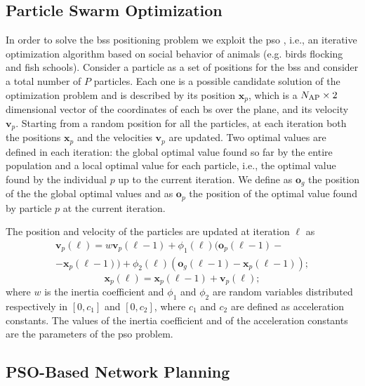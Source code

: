 \documentclass[twocolumns]{IEEEtran}
\begin{document}
\subsection{Particle Swarm Optimization}
In order to solve the \acp{bs} positioning problem we exploit the \ac{pso} \cite{Kennedy-11}, i.e., an iterative optimization algorithm based on social behavior of animals (e.g. birds flocking and fish schools). Consider a particle as a set of positions for the \acp{bs} and consider a total number of $P$ particles. Each one is a possible candidate solution of the optimization problem and is described by its position $\bm{x}_p$, which is a $N_{\rm AP} \times 2$ dimensional vector of the coordinates of each \ac{bs} over the plane, and its velocity $\bm{v}_p$.
Starting from a random position for all the particles, at each iteration both the positions $\bm{x}_p$ and the velocities $\bm{v}_p$ are updated. Two optimal values are defined in each iteration: the global optimal value found so far by the entire population and a local optimal value for each particle, i.e., the optimal value found by the individual $p$ up to the current iteration. We define as $\bm{o}_g$ the position of the the global optimal values and as $\bm{o}_p$ the position of the optimal value found by particle $p$ at the current iteration.

The position and velocity of the particles are updated at iteration $\ell$ as
   \begin{equation}\label{eq: v up}
\begin{split}
  \bm{v}_p(\ell) = w\bm{v}_p(\ell-1)+\phi_1(\ell)(\bm{o}_p(\ell-1)-\\
  -\bm{x}_p(\ell-1))+\phi_2(\ell)(\bm{o}_g(\ell-1)-\bm{x}_p(\ell-1));
  \end{split}
  \end{equation}
  \begin{equation}\label{eq: p up}
  \bm{x}_p(\ell) = \bm{x}_p(\ell-1) + \bm{v}_p(\ell);
 \end{equation}
where $w$ is the inertia coefficient and $\phi_1$ and $\phi_2$ are random variables distributed respectively in $[0,c_1]$ and $[0,c_2]$, where $c_1$ and $c_2$ are defined as acceleration constants. The values of the inertia coefficient and of the acceleration constants are the parameters of the \ac{pso} problem.

\subsection{PSO-Based Network Planning}
\end{document}
